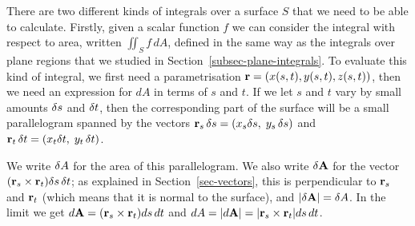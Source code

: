 \documentclass[reqno]{amsart}
\theoremstyle{definition}
\begin{document}
There are two different kinds of integrals over a surface $S$ that we
need to be able to calculate.  Firstly, given a scalar function $f$ we
can consider the integral with respect to area, written 
$\iint_Sf\,dA$, defined in the same way as the integrals over plane
regions that we studied in Section~\ref{subsec-plane-integrals}.
To evaluate this kind of integral, we first need a parametrisation
$\mathbf{r}=(x(s,t),y(s,t),z(s,t))$, then we need an expression for $dA$ in terms of
$s$ and $t$.  If we let $s$ and $t$ vary by small amounts $\delta s$ and
$\delta t$, then the corresponding part of the surface will be a small
parallelogram spanned by the vectors 
$\mathbf{r}_s\,\delta s=(x_s\delta s,\;y_s\,\delta s)$ and 
$\mathbf{r}_t\,\delta t=(x_t\delta t,\;y_t\,\delta t)$.  
\begin{center}
\end{center}
We write $\delta A$ for the area
of this parallelogram.  We also write $\delta\mathbf{A}$ for the vector
$(\mathbf{r}_s\times\mathbf{r}_t)\delta s\,\delta t$; as explained in 
Section~\ref{sec-vectors}, this is perpendicular to $\mathbf{r}_s$ and
$\mathbf{r}_t$ (which means that it is normal to the surface), and
$|\delta\mathbf{A}|=\delta A$.  In the limit we get $d\mathbf{A}=(\mathbf{r}_s\times\mathbf{r}_t)ds\,dt$ and 
$dA=|d\mathbf{A}|=|\mathbf{r}_s\times\mathbf{r}_t|ds\,dt$.
\end{document}
